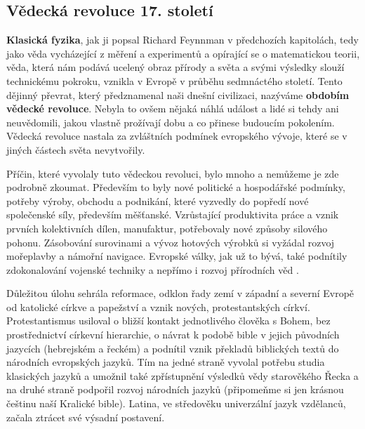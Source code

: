     \subsection{Vědecká revoluce 17. století}\label{fyz:IchapIIsecVII}
      \textbf{Klasická fyzika}, jak ji popsal Richard Feynnman v předchozích kapitolách, tedy jako
      věda vycházející z měření a experimentů a opírající se o matematickou teorii, věda, která nám
      podává ucelený obraz přírody a světa a svými výsledky slouží technickému pokroku, vznikla v
      Evropě v průběhu sedmnáctého století. Tento dějinný převrat, který předznamenal naši dnešní
      civilizaci, nazýváme \textbf{obdobím vědecké revoluce}. Nebyla to ovšem nějaká náhlá událost a
      lidé si tehdy ani neuvědomili, jakou vlastně prožívají dobu a co přinese budoucím pokolením.
      Vědecká revoluce nastala za zvláštních podmínek evropského vývoje, které se v jiných částech
      světa nevytvořily.

      Příčin, které vyvolaly tuto vědeckou revoluci, bylo mnoho a nemůžeme je zde podrobně zkoumat.
      Především to byly nové politické a hospodářské podmínky, potřeby výroby, obchodu a podnikání,
      které vyzvedly do popředí nové společenské síly, především měšťanské. Vzrůstající produktivita
      práce a vznik prvních kolektivních dílen, manufaktur, potřebovaly nové způsoby silového
      pohonu. Zásobování surovinami a vývoz hotových výrobků si vyžádal rozvoj mořeplavby a námořní
      navigace. Evropské války, jak už to bývá, také podnítily zdokonalování vojenské techniky a
      nepřímo i rozvoj přírodních věd \cite[s.~137]{Stoll2009}.

      Důležitou úlohu sehrála reformace, odklon řady zemí v západní a severní Evropě od katolické
      církve a papežství a vznik nových, protestantských církví. Protestantismus usiloval o bližší
      kontakt jednotlivého člověka s Bohem, bez prostřednictví církevní hierarchie, o návrat k
      podobě bible v jejich původních jazycích (hebrejském a řeckém) a podnítil vznik překladů
      biblických textů do národních evropských jazyků. Tím na jedné straně vyvolal potřebu studia
      klasických jazyků a umožnil také zpřístupnění výsledků vědy starověkého Řecka a na druhé
      straně podpořil rozvoj národních jazyků (připomeňme si jen krásnou češtinu naší Kralické
      bible). Latina, ve středověku univerzální jazyk vzdělanců, začala ztrácet své výsadní
      postavení.

